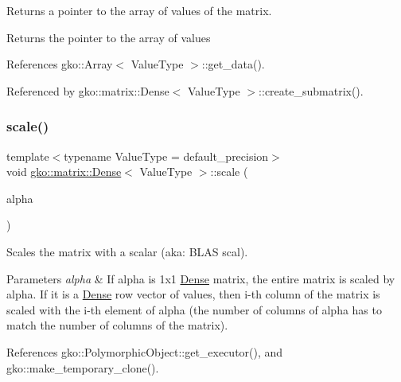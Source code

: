 Returns a pointer to the array of values of the matrix. 

\begin{DoxyReturn}{Returns}
the pointer to the array of values 
\end{DoxyReturn}


References gko\+::\+Array$<$ Value\+Type $>$\+::get\+\_\+data().



Referenced by gko\+::matrix\+::\+Dense$<$ Value\+Type $>$\+::create\+\_\+submatrix().

\mbox{\label{classgko_1_1matrix_1_1Dense_a35cb8dfff52daf3aa8995597d26981ec}} 
\subsubsection{\texorpdfstring{scale()}{scale()}}
{\footnotesize\ttfamily template$<$typename Value\+Type = default\+\_\+precision$>$ \\
void \hyperlink{classgko_1_1matrix_1_1Dense}{gko\+::matrix\+::\+Dense}$<$ Value\+Type $>$\+::scale (\begin{DoxyParamCaption}\item[{const \hyperlink{classgko_1_1LinOp}{Lin\+Op} $\ast$}]{alpha }\end{DoxyParamCaption})}



Scales the matrix with a scalar (aka\+: B\+L\+AS scal). 


\begin{DoxyParams}{Parameters}
{\em alpha} & If alpha is 1x1 \hyperlink{classgko_1_1matrix_1_1Dense}{Dense} matrix, the entire matrix is scaled by alpha. If it is a \hyperlink{classgko_1_1matrix_1_1Dense}{Dense} row vector of values, then i-\/th column of the matrix is scaled with the i-\/th element of alpha (the number of columns of alpha has to match the number of columns of the matrix). \\
\hline
\end{DoxyParams}


References gko\+::\+Polymorphic\+Object\+::get\+\_\+executor(), and gko\+::make\+\_\+temporary\+\_\+clone().

\mbox{\label{classgko_1_1matrix_1_1Dense_a64ea8e876f5390a535a2ef486bd5ab9a}} 
